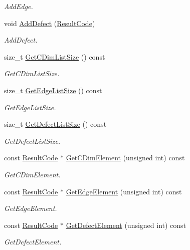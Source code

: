 \begin{DoxyCompactItemize}
\begin{DoxyCompactList}\small\item\em Add\+Edge. \end{DoxyCompactList}\item 
void \hyperlink{classdata__model_1_1_section_alpha_ae957bfa630fd3afe6c826cfd142966f9}{Add\+Defect} (\hyperlink{structdata__model_1_1_result_code}{Result\+Code})\hypertarget{classdata__model_1_1_section_alpha_ae957bfa630fd3afe6c826cfd142966f9}{}\label{classdata__model_1_1_section_alpha_ae957bfa630fd3afe6c826cfd142966f9}

\begin{DoxyCompactList}\small\item\em Add\+Defect. \end{DoxyCompactList}\item 
size\+\_\+t \hyperlink{classdata__model_1_1_section_alpha_aa2358cc77c3550a0478c3b4d7bce3243}{Get\+C\+Dim\+List\+Size} () const 
\begin{DoxyCompactList}\small\item\em Get\+C\+Dim\+List\+Size. \end{DoxyCompactList}\item 
size\+\_\+t \hyperlink{classdata__model_1_1_section_alpha_aa2549b4e536321e57a16f1091fa1498e}{Get\+Edge\+List\+Size} () const 
\begin{DoxyCompactList}\small\item\em Get\+Edge\+List\+Size. \end{DoxyCompactList}\item 
size\+\_\+t \hyperlink{classdata__model_1_1_section_alpha_a3aa4de03f8a2e085e5c2c27c5a03eac3}{Get\+Defect\+List\+Size} () const 
\begin{DoxyCompactList}\small\item\em Get\+Defect\+List\+Size. \end{DoxyCompactList}\item 
const \hyperlink{structdata__model_1_1_result_code}{Result\+Code} $\ast$ \hyperlink{classdata__model_1_1_section_alpha_aee3028b8f651b2d9a3146d4c9bccdb42}{Get\+C\+Dim\+Element} (unsigned int) const 
\begin{DoxyCompactList}\small\item\em Get\+C\+Dim\+Element. \end{DoxyCompactList}\item 
const \hyperlink{structdata__model_1_1_result_code}{Result\+Code} $\ast$ \hyperlink{classdata__model_1_1_section_alpha_a507f5b4e4a54e32caa7e5f4d166f836d}{Get\+Edge\+Element} (unsigned int) const 
\begin{DoxyCompactList}\small\item\em Get\+Edge\+Element. \end{DoxyCompactList}\item 
const \hyperlink{structdata__model_1_1_result_code}{Result\+Code} $\ast$ \hyperlink{classdata__model_1_1_section_alpha_ae02eec2a868713066f67a6a9b82c9e5b}{Get\+Defect\+Element} (unsigned int) const 
\begin{DoxyCompactList}\small\item\em Get\+Defect\+Element. \end{DoxyCompactList}\end{DoxyCompactItemize}
